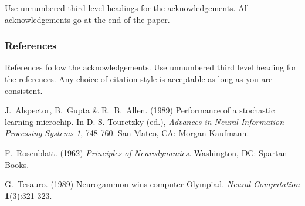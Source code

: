 Use unnumbered third level headings for the acknowledgements.  All
acknowledgements go at the end of the paper.


\subsubsection*{References}

References follow the acknowledgements.  Use unnumbered third level
heading for the references.  Any choice of citation style is
acceptable as long as you are consistent.


J.~Alspector, B.~Gupta \& R.~B.~Allen.  (1989) Performance of a
stochastic learning microchip.  In D. S. Touretzky (ed.), {\it
Advances in Neural Information Processing Systems 1}, 748-760.  San
Mateo, CA: Morgan Kaufmann.

F.~Rosenblatt. (1962) {\it Principles of Neurodynamics.}
Washington, DC: Spartan Books.

G.~Tesauro. (1989) Neurogammon wins computer Olympiad.  {\it Neural
Computation} {\bf 1}(3):321-323.


